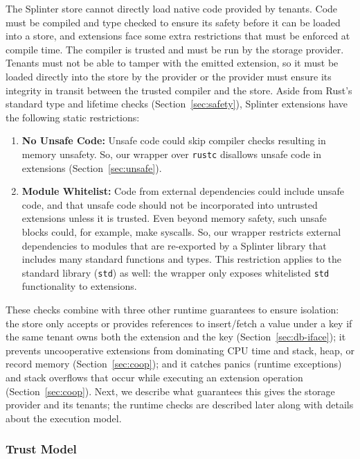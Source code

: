 The Splinter store cannot directly load native code provided by tenants.
Code must be compiled and type checked to ensure its safety before it can be
  loaded into a store, and extensions face some extra restrictions that must be
  enforced at compile time.
The compiler is trusted and must be run by the storage provider.
Tenants must not be able to tamper with the emitted extension, so it must be
  loaded directly into the store by the provider or the provider must
  ensure its integrity in transit between the trusted compiler and the store.
Aside from Rust's standard type and lifetime checks (Section~\ref{sec:safety}),
  Splinter extensions have the following static restrictions:
  \begin{enumerate}
    \item {\bf No Unsafe Code:}
      Unsafe code could skip compiler checks resulting in memory unsafety.
      So, our wrapper over \texttt{rustc} disallows unsafe code in extensions
      (Section~\ref{sec:unsafe}).
    \item {\bf Module Whitelist:}
      Code from external dependencies could include unsafe code, and that
        unsafe code should not be incorporated into untrusted extensions unless it
        is trusted.
      Even beyond memory safety, such unsafe blocks could, for example, make
        syscalls.
      So, our wrapper restricts external dependencies to modules that are
        re-exported by a Splinter library that includes many standard functions
        and types.
      This restriction applies to the standard library (\texttt{std}) as well: the
        wrapper only exposes whitelisted \texttt{std} functionality to extensions.
  \end{enumerate}
These checks combine with three other runtime guarantees to
  ensure isolation:
the store only accepts or provides references to insert/fetch a value under a key
  if the same tenant owns both the extension and the key (Section~\ref{sec:db-iface});
it prevents uncooperative extensions from dominating CPU time and stack,
heap, or record memory (Section~\ref{sec:coop}); and
it catches panics (runtime exceptions) and stack overflows that occur while executing an
  extension operation (Section~\ref{sec:coop}).
Next, we describe what guarantees this gives the storage provider and its tenants;
  the runtime checks are described later along with details about the execution model.

\subsubsection{Trust Model}
\label{sec:trust}

